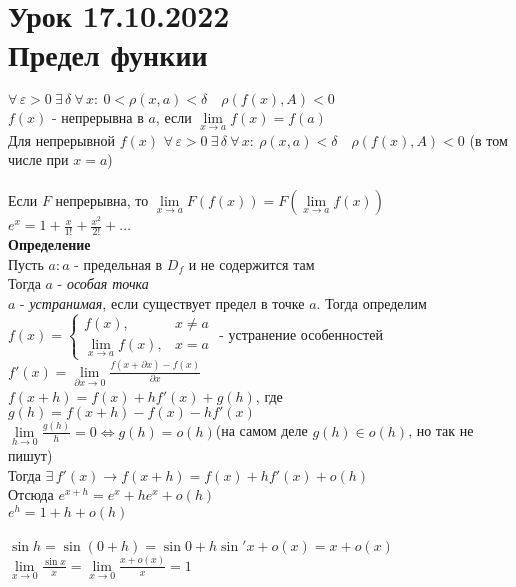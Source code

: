 \documentclass[12pt]{article}
\begin{document}
\section{Урок 17.10.2022\\Предел функии}
$\forall\,\varepsilon > 0\ \exists\,\delta\ \forall\,x:\ 0<\rho(x,a)<\delta\quad \rho(f(x),A) < 0$\\
$f(x)$ - непрерывна в $a$, если $\lim\limits_{x\rightarrow a} f(x) = f(a)$\\
Для непрерывной $f(x)$ $\forall\,\varepsilon > 0\ \exists\,\delta\ \forall\,x:\ \rho(x,a)<\delta\quad \rho(f(x),A) < 0$ (в том числе при $x=a$)\\\\
Если $F$ непрерывна, то $\lim\limits_{x\rightarrow a} F(f(x)) = F(\lim\limits_{x\rightarrow a} f(x))$\\
$e^x = 1+\frac x{1!} + \frac{x^2}{2!}+\ldots$\\
\textbf{Определение}\\
Пусть $a: a$ - предельная в $D_f$ и не содержится там\\
Тогда $a$ - \textit{особая точка}\\
$a$ - \textit{устранимая}, если существует предел в точке $a$.
Тогда определим $f(x)=\left\{\begin{array}{ll}
     f(x), & x\neq a\\
     \lim\limits_{x\rightarrow a} f(x), & x = a 
\end{array}\right.$ - устранение особенностей\\
$f'(x) = \lim\limits_{\partial x\rightarrow 0} \frac{f(x+\partial x)-f(x)}{\partial x}$\\
$f(x+h)=f(x)+hf'(x)+g(h)$, где $g(h) = f(x+h)-f(x)-hf'(x)$\\
$\lim\limits_{h \rightarrow 0} \frac{g(h)}{h} = 0 \Leftrightarrow g(h) = o(h)$(на самом деле $g(h) \in o(h)$, но так не пишут)\\
Тогда $\exists\, f'(x)\rightarrow f(x+h)=f(x)+hf'(x)+o(h)$\\
Отсюда $e^{x+h} = e^x+he^x+o(h)$\\
$e^h = 1 + h + o(h)$\\\\
$\sin h = \sin (0+h) = \sin 0 + h\sin' x+o(x) = x+o(x)$
$\lim\limits_{x\rightarrow 0} \frac{\sin x}{x} = \lim\limits_{x\rightarrow 0} \frac{x+o(x)}{x} = 1$
\end{document}
